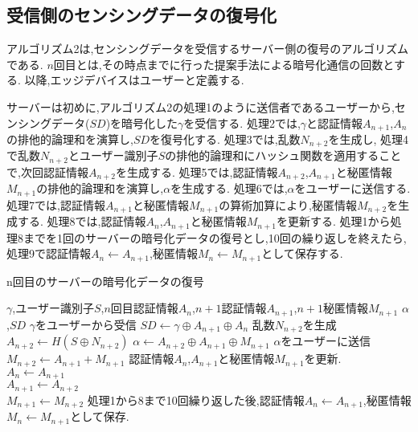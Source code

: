 \subsection{受信側のセンシングデータの復号化}

アルゴリズム2は,センシングデータを受信するサーバー側の復号のアルゴリズムである.
$n$回目とは,その時点までに行った提案手法による暗号化通信の回数とする.
以降,エッジデバイスはユーザーと定義する.


サーバーは初めに,アルゴリズム2の処理1のように送信者であるユーザーから,センシングデータ($SD$)を暗号化した$\gamma$を受信する.
処理2では,$\gamma$と認証情報$A_{n+1}$,$A_n$の排他的論理和を演算し,$SD$を復号化する.
処理3では,乱数$N_{n+2}$を生成し,
処理4で乱数$N_{n+2}$とユーザー識別子$S$の排他的論理和にハッシュ関数を適用することで,次回認証情報$A_{n+2}$を生成する.
処理5では,認証情報$A_{n+2}$,$A_{n+1}$と秘匿情報$M_{n+1}$の排他的論理和を演算し,$\alpha$を生成する.
処理6では,$\alpha$をユーザーに送信する.
処理7では,認証情報$A_{n+1}$と秘匿情報$M_{n+1}$の算術加算により,秘匿情報$M_{n+2}$を生成する.
処理8では,認証情報$A_n$,$A_{n+1}$と秘匿情報$M_{n+1}$を更新する.
処理1から処理8までを1回のサーバーの暗号化データの復号とし,10回の繰り返しを終えたら,処理9で認証情報$A_n \leftarrow A_{n+1}$,秘匿情報$M_n \leftarrow M_{n+1}$として保存する.
\begin{algorithm}[H]
\caption{n回目のサーバーの暗号化データの復号}
\begin{algorithmic}[1]
\renewcommand{\algorithmicrequire}{\textbf{Input:}}
\renewcommand{\algorithmicensure}{\textbf{Output:}}
\REQUIRE $\gamma$,ユーザー識別子$S$,$n$回目認証情報$A_n$,$n+1$認証情報$A_{n+1}$,$n+1$秘匿情報$M_{n+1}$
\ENSURE $\alpha$,$SD$
\STATE $\gamma$をユーザーから受信
\STATE $SD \leftarrow \gamma \oplus A_{n+1} \oplus A_n$
\STATE 乱数$N_{n+2}$を生成
\STATE $A_{n+2} \leftarrow H(S \oplus N_{n+2})$
\STATE $\alpha \leftarrow A_{n+2} \oplus A_{n+1} \oplus M_{n+1}$
\STATE $\alpha$をユーザーに送信
\STATE $M_{n+2} \leftarrow A_{n+1} + M_{n+1}$
\STATE 認証情報$A_n$,$A_{n+1}$と秘匿情報$M_{n+1}$を更新.
\\ $A_n \leftarrow A_{n+1}$
\\ $A_{n+1} \leftarrow A_{n+2}$
\\ $M_{n+1} \leftarrow M_{n+2}$
\STATE 処理1から8まで10回繰り返した後,認証情報$A_n \leftarrow A_{n+1}$,秘匿情報$M_n \leftarrow M_{n+1}$として保存.
\end{algorithmic} 
\end{algorithm}


